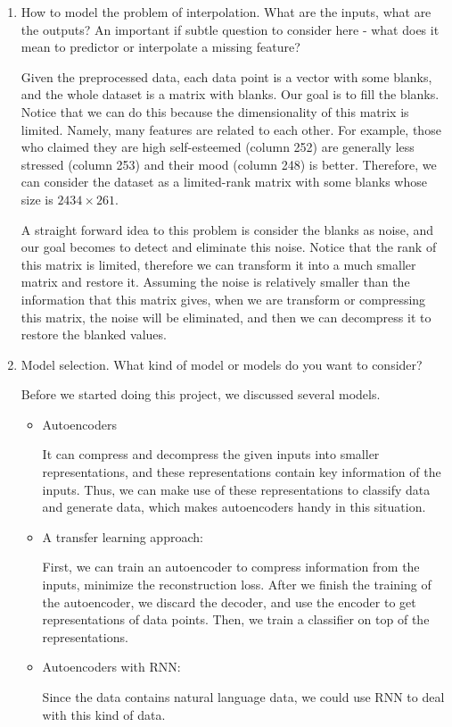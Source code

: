 \documentclass[11pt, a4paper]{article}
\makeatletter
\def\namedlabel#1#2{\begingroup
	\def\@currentlabel{#2}%
	\phantomsection\label{#1}\endgroup
}
\makeatother
\begin{document}
\begin{enumerate}
	\item{How to model the problem of interpolation. What are the inputs, what are the outputs? An important if subtle question to consider here - what does it mean to predictor or interpolate a missing feature?}
	\namedlabel{interpolation}{Formalization of interpolation}
	\par{Given the preprocessed data, each data point is a vector with some blanks, and the whole dataset is a matrix with blanks. Our goal is to fill the blanks. Notice that we can do this because the dimensionality of this matrix is limited. Namely, many features are related to each other. For example, those who claimed they are high self-esteemed (column 252) are generally less stressed (column 253) and their mood (column 248) is better. Therefore, we can consider the dataset as a limited-rank matrix with some blanks whose size is $2434 \times 261$.}
	\par{A straight forward idea to this problem is consider the blanks as noise, and our goal becomes to detect and eliminate this noise. Notice that the rank of this matrix is limited, therefore we can transform it into a much smaller matrix and restore it. Assuming the noise is relatively smaller than the information that this matrix gives, when we are transform or compressing this matrix, the noise will be eliminated, and then we can decompress it to restore the blanked values.}
	
	\item{Model selection. What kind of model or models do you want to consider?}
	\par{Before we started doing this project, we discussed several models.}
	\begin{itemize}
		\item {Autoencoders}
		\par{It can compress and decompress the given inputs into smaller representations, and these representations contain key information of the inputs. Thus, we can make use of these representations to classify data and generate data, which makes autoencoders handy in this situation.}
		\item {A transfer learning approach:}
		\par{First, we can train an autoencoder to compress information from the inputs, minimize the reconstruction loss. After we finish the training of the autoencoder, we discard the decoder, and use the encoder to get representations of data points. Then, we train a classifier on top of the representations.}
		\item {Autoencoders with RNN:}
		\par{Since the data contains natural language data, we could use RNN to deal with this kind of data.}
	\end{itemize}
\end{enumerate}
\end{document}
